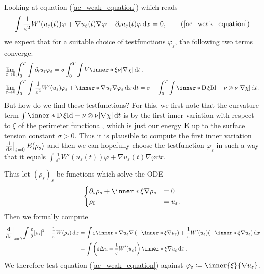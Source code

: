 Looking at equation (\ref{ac_weak_equation}) which reads
\begin{equation*}
	\int
	\frac{ 1 }{ \varepsilon^{ 2 } } W' ( u_{ \varepsilon} ( t ) ) \varphi
	+
	\nabla u_{ \varepsilon } ( t ) \nabla \varphi
	+
	\partial_{ t } u_{ \varepsilon} ( t ) \varphi 
	\dd{x}
	=
	0,
	\tag{\ref{ac_weak_equation}}
\end{equation*}
we expect that for a suitable choice of testfunctions $ \varphi_{ \varepsilon } $, the following two terms converge:
\begin{align*}
	& \lim_{ \varepsilon \to 0 }
		\int_{ 0 }^{ T }
			\int 
			\partial_{ t } u_{ \varepsilon } \varphi_{ \varepsilon }
	=
	\sigma
	\int_{ 0 }^{ T }
		\int
			V \inner*{ \xi }{ \nu }
		\abs{ \nabla \chi }
	\dd{ t },
	\\
	& \lim_{ \varepsilon \to 0 }
		\int_{ 0 }^{ T }
		\int
			\frac{1 }{ \varepsilon^{ 2 } }
			W'( u_{ \varepsilon } )
			\varphi_{ \varepsilon}
			+ 
			\inner*{ \nabla u_{ \varepsilon } }{ \nabla \varphi_{ \varepsilon } }
		\dd{ x }
		\dd{ t }
	=
	\sigma
	- \int_{ 0 }^{ T }
		\int
			\inner*{ \diff \xi }{ \mathrm{Id} - \nu \otimes \nu }
		\abs{ \nabla \chi }
	\dd{ t }.
\end{align*}
But how do we find these testfunctions? For this, we first note that the curvature term
$ \int \inner*{ \diff \xi }{ \mathrm{Id} - \nu \otimes \nu } \abs{ \nabla \chi } \dd{ t } $ is by \cite[Thm.~17.5]{maggi_sets_of_finite_perimeter} the first inner variation with respect to $ \xi $ of the perimeter functional, which is just our energy $ \operatorname{E} $ up to the surface tension constant $ \sigma > 0 $. Thus it is plausible to compute the first inner variation 
$ \left.\dv{ s } \right|_{ s = 0 } E ( \rho_{ s } ) $ and then we can hopefully choose the testfunction $ \varphi_{ \varepsilon } $ in such a way that it equals
$ 
\int
\frac{ 1 }{ \varepsilon^{ 2 } } W' ( u_{ \varepsilon} ( t ) ) \varphi
+
\nabla u_{ \varepsilon } ( t ) \nabla \varphi
\dd{x}
$.

Thus let $ ( \rho_{ s } )_{ s } $ be functions which solve the ODE
\[
	\begin{cases}
	\partial_{ s } \rho_{ s } 
	+
	\inner*{ \xi }{ \nabla \rho_{ s } }
	& = 0
	\\
	\rho_{ 0 } & = u_{ \varepsilon }.
	\end{cases}
\]
Then we formally compute 
\begin{align*}
	\left.\dv{ s }\right|_{ s = 0 }
		\int
			\frac{ \varepsilon }{ 2 }
			\abs{ \rho_{ s } }^{ 2 }
			+
			\frac{ 1 }{ \varepsilon }
			W ( \rho_{ s } )
		\dd{ x }
	& =
	\int
		\varepsilon 
		\inner*{ \nabla u_{ \varepsilon } }
		{ \nabla \left( - \inner*{ \xi }{ \nabla u_{ \varepsilon } } \right) }
		+
		\frac{ 1 }{ \varepsilon }
		W'( u_{ \varepsilon } ) ( -\inner*{ \xi }{ \nabla u_{ \varepsilon } } )
	\dd{ x }
	\\
	& =
	\int
		\left(
			\varepsilon \Delta u - \frac{ 1 }{ \varepsilon } W'( u_{ \varepsilon } )
		\right)
		\inner*{ \xi }{ \nabla u_{ \varepsilon } } 
	\dd{ x }.
\end{align*}
We therefore test equation (\ref{ac_weak_equation}) against $ \varphi_{ \varepsilon } \coloneqq \inner{ \xi }{ \nabla u_{ \varepsilon } } $.

